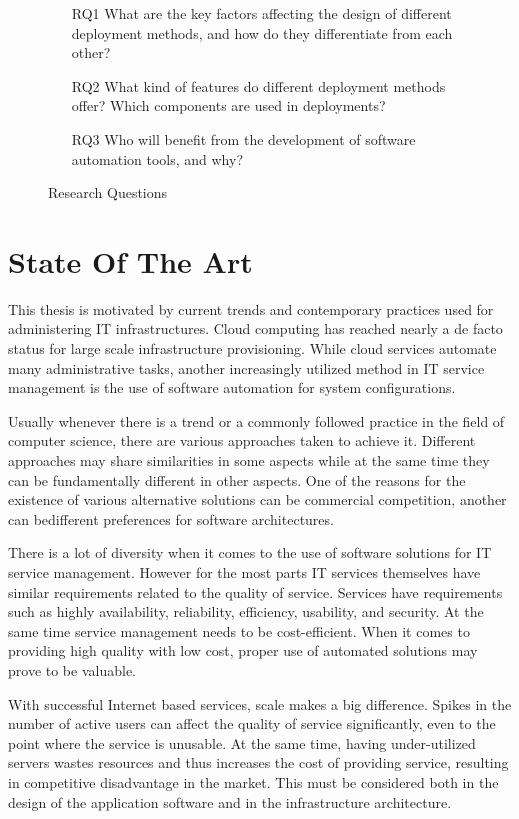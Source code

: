 \documentclass[officiallayout]{tktla}
\begin{document}
\begin{figure}[t]
\centering
\begin{itemize}
  \item [RQ1] What are the key factors affecting the design of different
              deployment methods, and how do they differentiate from each
              other?
  \item [RQ2] What kind of features do different deployment methods offer?
              Which components are used in deployments?
  \item [RQ3] Who will benefit from the development of software automation
              tools, and why?
\end{itemize}
\caption{Research Questions}
\label{fig:rqs}
\end{figure}

\chapter{State Of The Art}

This thesis is motivated by current trends and contemporary practices used for
administering IT infrastructures. Cloud computing has reached nearly a de facto
status for large scale infrastructure provisioning. While cloud services
automate many administrative tasks, another increasingly utilized method in IT
service management is the use of software automation for system configurations.

Usually whenever there is a trend or a commonly followed practice in the field
of computer science, there are various approaches taken to achieve it.
Different approaches may share similarities in some aspects while at the same
time they can be fundamentally different in other aspects. One of the reasons
for the existence of various alternative solutions can be commercial
competition, another can bedifferent preferences for software architectures.

There is a lot of diversity when it comes to the use of software solutions for
IT service management. However for the most parts IT services themselves have
similar requirements related to the quality of service. Services have
requirements such as highly availability, reliability, efficiency, usability,
and security. At the same time service management needs to be cost-efficient.
When it comes to providing high quality with low cost, proper use of automated
solutions may prove to be valuable.

With successful Internet based services, scale makes a big difference. Spikes
in the number of active users can affect the quality of service significantly,
even to the point where the service is unusable. At the same time, having
under-utilized servers wastes resources and thus increases the cost of
providing service, resulting in competitive disadvantage in the market. This
must be considered both in the design of the application software and in the
infrastructure architecture.
\end{document}
